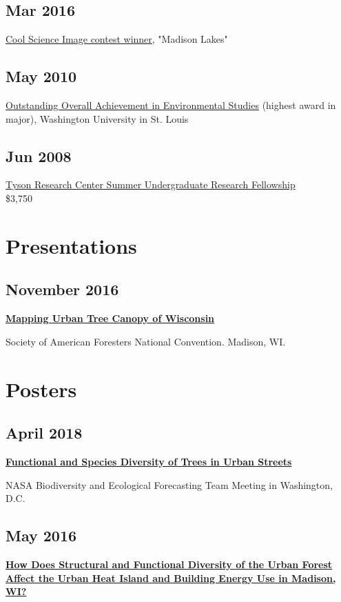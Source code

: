 \documentclass{article}
\begin{document}
\subsection*{Mar 2016}
\label{sec:orge6cedd7}
\href{http://news.wisc.edu/cool-science-images-2016/\#\&gid=1\&pid=10}{Cool Science Image contest winner}, "Madison Lakes" \\

\subsection*{May  2010}
\label{sec:org78fd1db}
\href{http://enst.wustl.edu/program/awards}{Outstanding Overall Achievement in Environmental Studies} (highest
award in major), Washington University in St. Louis

\subsection*{Jun 2008}
\label{sec:orgc0ae9e4}
\href{http://tyson.wustl.edu/teaching-ugrad.php}{Tyson Research Center Summer Undergraduate Research Fellowship} \\
 \$3,750

\section*{Presentations}
\label{sec:org2ad0c03}
\subsection*{November 2016}
\label{sec:org3ed126a}
\textbf{\href{http://pages.stat.wisc.edu/\~erker/Presentations/SAF\_20161105/saf\_presentation.html}{Mapping Urban Tree Canopy of Wisconsin}}

Society of American Foresters National Convention. Madison, WI.
\section*{Posters}
\label{sec:orga98da2b}
\subsection*{April 2018}
\label{sec:org97777da}
\textbf{\href{http://pages.stat.wisc.edu/\~erker/Posters/NASA\_poster\_2018.jpg}{Functional and Species Diversity of Trees in Urban Streets}}

NASA Biodiversity and Ecological Forecasting Team Meeting in
Washington, D.C.
\subsection*{May 2016}
\label{sec:orga9555f6}
\textbf{\href{http://pages.stat.wisc.edu/\~erker/Posters/NASA\_poster\_2016.jp2}{How Does Structural and Functional Diversity of the Urban Forest
Affect the Urban Heat Island and Building Energy Use in Madison, WI?}}
\end{document}
